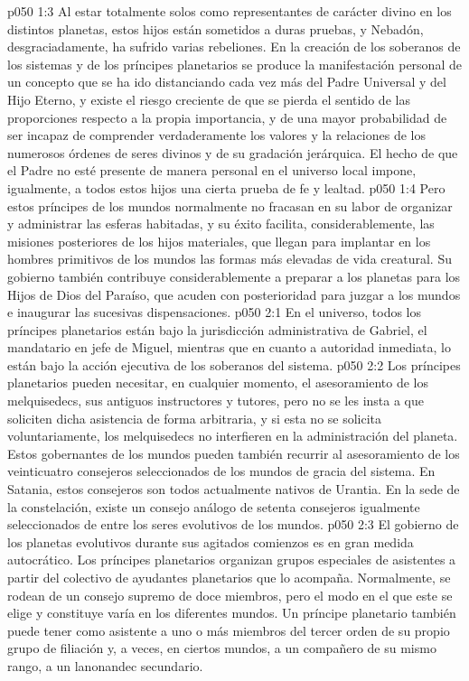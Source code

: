 \vs p050 1:3 Al estar totalmente solos como representantes de carácter divino en los distintos planetas, estos hijos están sometidos a duras pruebas, y Nebadón, desgraciadamente, ha sufrido varias rebeliones. En la creación de los soberanos de los sistemas y de los príncipes planetarios se produce la manifestación personal de un concepto que se ha ido distanciando cada vez más del Padre Universal y del Hijo Eterno, y existe el riesgo creciente de que se pierda el sentido de las proporciones respecto a la propia importancia, y de una mayor probabilidad de ser incapaz de comprender verdaderamente los valores y la relaciones de los numerosos órdenes de seres divinos y de su gradación jerárquica. El hecho de que el Padre no esté presente de manera personal en el universo local impone, igualmente, a todos estos hijos una cierta prueba de fe y lealtad.
\vs p050 1:4 Pero estos príncipes de los mundos normalmente no fracasan en su labor de organizar y administrar las esferas habitadas, y su éxito facilita, considerablemente, las misiones posteriores de los hijos materiales, que llegan para implantar en los hombres primitivos de los mundos las formas más elevadas de vida creatural. Su gobierno también contribuye considerablemente a preparar a los planetas para los Hijos de Dios del Paraíso, que acuden con posterioridad para juzgar a los mundos e inaugurar las sucesivas dispensaciones.
\vs p050 2:1 En el universo, todos los príncipes planetarios están bajo la jurisdicción administrativa de Gabriel, el mandatario en jefe de Miguel, mientras que en cuanto a autoridad inmediata, lo están bajo la acción ejecutiva de los soberanos del sistema.
\vs p050 2:2 Los príncipes planetarios pueden necesitar, en cualquier momento, el asesoramiento de los melquisedecs, sus antiguos instructores y tutores, pero no se les insta a que soliciten dicha asistencia de forma arbitraria, y si esta no se solicita voluntariamente, los melquisedecs no interfieren en la administración del planeta. Estos gobernantes de los mundos pueden también recurrir al asesoramiento de los veinticuatro consejeros seleccionados de los mundos de gracia del sistema. En Satania, estos consejeros son todos actualmente nativos de Urantia. En la sede de la constelación, existe un consejo análogo de setenta consejeros igualmente seleccionados de entre los seres evolutivos de los mundos.
\vs p050 2:3 El gobierno de los planetas evolutivos durante sus agitados comienzos es en gran medida autocrático. Los príncipes planetarios organizan grupos especiales de asistentes a partir del colectivo de ayudantes planetarios que lo acompaña. Normalmente, se rodean de un consejo supremo de doce miembros, pero el modo en el que este se elige y constituye varía en los diferentes mundos. Un príncipe planetario también puede tener como asistente a uno o más miembros del tercer orden de su propio grupo de filiación y, a veces, en ciertos mundos, a un compañero de su mismo rango, a un lanonandec secundario.
